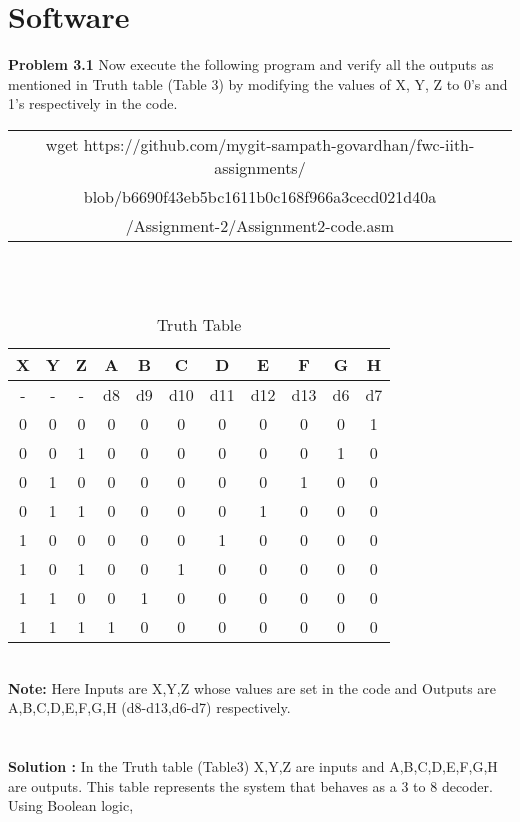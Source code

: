 \documentclass[journal,12pt,twocolumn]{IEEEtran}
\begin{document}
\section{Software}

\textbf{Problem 3.1} Now execute the following program and verify all the outputs as mentioned in Truth table (Table 3) by modifying the values of X, Y, Z to 0's and 1's respectively in the code. \\
\begin{table}[h]
    \centering
    \begin{tabular}{| c |}
    \hline
    wget https://github.com/mygit-sampath-govardhan/fwc-iith-assignments/\\blob/b6690f43eb5bc1611b0c168f966a3cecd021d40a\\/Assignment-2/Assignment2-code.asm\\
    \hline
    \end{tabular}
\end{table}
\\
\\
    \begin{table}[h]
    \centering
    \begin{tabular}{| c | c | c || c | c | c | c | c | c | c | c |}
    \hline
    \textbf{X} & \textbf{Y} & \textbf{Z} & \textbf{A} & \textbf{B} & \textbf{C} & \textbf{D} & \textbf{E} & \textbf{F} & \textbf{G} & \textbf{H} \\
    \hline
    - & - & - & d8 & d9 & d10 & d11 & d12 & d13 & d6 & d7 \\
    \hline
    0 & 0 & 0 & 0 & 0 & 0 & 0 & 0 & 0 & 0 & 1  \\
    \hline
    0 & 0 & 1 & 0 & 0 & 0 & 0 & 0 & 0 & 1 & 0  \\
    \hline
    0 & 1 & 0 & 0 & 0 & 0 & 0 & 0 & 1 & 0 & 0  \\
    \hline
    0 & 1 & 1 & 0 & 0 & 0 & 0 & 1 & 0 & 0 & 0  \\
    \hline
    1 & 0 & 0 & 0 & 0 & 0 & 1 & 0 & 0 & 0 & 0  \\
    \hline
    1 & 0 & 1 & 0 & 0 & 1 & 0 & 0 & 0 & 0 & 0  \\
    \hline
    1 & 1 & 0 & 0 & 1 & 0 & 0 & 0 & 0 & 0 & 0  \\
    \hline
    1 & 1 & 1 & 1 & 0 & 0 & 0 & 0 & 0 & 0 & 0  \\
    \hline
    \end{tabular}
    \caption{Truth Table}
    \label{tab:my_label}
 \end{table}
 \\
 \textbf{Note:} Here Inputs are X,Y,Z whose values are set in the code and Outputs are A,B,C,D,E,F,G,H (d8-d13,d6-d7) respectively.\\
 \\
 \\
\textbf{Solution :}  In the Truth table (Table3) X,Y,Z are inputs and A,B,C,D,E,F,G,H are outputs. This table represents the system that behaves as a 3 to 8 decoder. Using Boolean logic, \\
\\
\\
\\
\end{document}
